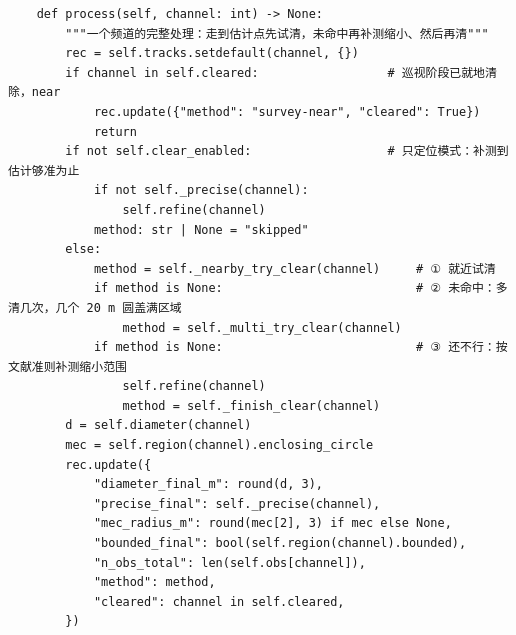 \documentclass[UTF8, zihao=5,AutoFakeBold=2]{ctexart}
\begin{document}
\begin{lstlisting}
    def process(self, channel: int) -> None:
        """一个频道的完整处理：走到估计点先试清，未命中再补测缩小、然后再清"""
        rec = self.tracks.setdefault(channel, {})
        if channel in self.cleared:                  # 巡视阶段已就地清除，near
            rec.update({"method": "survey-near", "cleared": True})
            return
        if not self.clear_enabled:                   # 只定位模式：补测到估计够准为止
            if not self._precise(channel):
                self.refine(channel)
            method: str | None = "skipped"
        else:
            method = self._nearby_try_clear(channel)     # ① 就近试清
            if method is None:                           # ② 未命中：多清几次，几个 20 m 圆盖满区域
                method = self._multi_try_clear(channel)
            if method is None:                           # ③ 还不行：按文献准则补测缩小范围
                self.refine(channel)
                method = self._finish_clear(channel)
        d = self.diameter(channel)
        mec = self.region(channel).enclosing_circle
        rec.update({
            "diameter_final_m": round(d, 3),
            "precise_final": self._precise(channel),
            "mec_radius_m": round(mec[2], 3) if mec else None,
            "bounded_final": bool(self.region(channel).bounded),
            "n_obs_total": len(self.obs[channel]),
            "method": method,
            "cleared": channel in self.cleared,
        })


\end{lstlisting}
\end{document}
